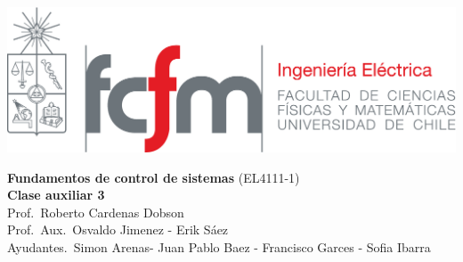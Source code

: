\documentclass[
  11pt,
  letterpaper,
   addpoints,
   answers
  ]{exam}
\begin{document}
\noindent
\begin{minipage}{0.47\textwidth}
\includegraphics[width=\textwidth]{../fcfm_die}
\end{minipage}
\begin{minipage}{0.53\textwidth}
\begin{center} 
\large\textbf{Fundamentos de control de sistemas} (EL4111-1) \\
\large\textbf{Clase auxiliar 3} \\
\small Prof.~Roberto Cardenas Dobson\\
\small Prof.~Aux.~Osvaldo Jimenez - Erik Sáez\\
\small Ayudantes.~Simon Arenas- Juan Pablo Baez - Francisco Garces - Sofia Ibarra\\
\end{center}
\end{minipage}

\vspace{0.5cm}
\noindent
\vspace{.85cm}
\end{document}
